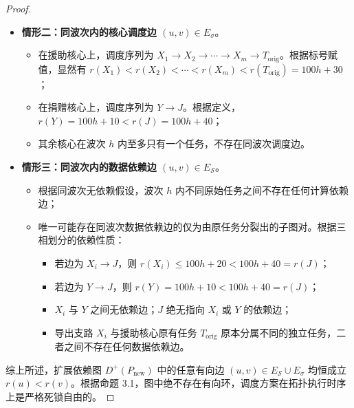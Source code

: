 \documentclass[anonymous,withtoc]{gmcm2026}
\providecommand{\tightlist}{\setlength{\itemsep}{0pt}\setlength{\parskip}{0pt}}
\begin{document}
\begin{proof}
\begin{itemize}
  \begin{itemize}
  \tightlist
  \item
    对于数据依赖边 \((u, v) \in E_{\mathcal{S}}\)：若 \(u\) 与 \(v\) 属于不同波次，由于 Task 拓扑高度的定义，所有外部前驱的高度严格小于后继任务的高度，故必有 \(h(u) \le h(v) - 1\)。因此 \(r(u) \le 100h(u) + 50 \le 100(h(v) - 1) + 50 = 100h(v) - 50 < 100h(v) + 10 \le r(v)\)，整数标号严格递增；
  \item
    对于同一核心上的调度次序边 \((u, v) \in E_\sigma\)：由于新方案严格保持波次单调推进，不同波次间的调度边同样满足 \(h(u) < h(v)\)，故必然有 \(r(u) < r(v)\)。
  \end{itemize}
\item
  \textbf{情形二：同波次内的核心调度边 \((u, v) \in E_\sigma\)}。

  \begin{itemize}
  \tightlist
  \item
    在援助核心上，调度序列为 \(X_1 \to X_2 \to \cdots \to X_m \to T_{\mathrm{orig}}\)。根据标号赋值，显然有 \(r(X_1) < r(X_2) < \cdots < r(X_m) < r(T_{\mathrm{orig}}) = 100h + 30\)；
  \item
    在捐赠核心上，调度序列为 \(Y \to J\)。根据定义，\(r(Y) = 100h + 10 < r(J) = 100h + 40\)；
  \item
    其余核心在波次 \(h\) 内至多只有一个任务，不存在同波次调度边。
  \end{itemize}
\item
  \textbf{情形三：同波次内的数据依赖边 \((u, v) \in E_{\mathcal{S}}\)}。

  \begin{itemize}
  \tightlist
  \item
    根据同波次无依赖假设，波次 \(h\) 内不同原始任务之间不存在任何计算依赖边；
  \item
    唯一可能存在同波次数据依赖边的仅为由原任务分裂出的子图对。根据三相划分的依赖性质：

    \begin{itemize}
    \tightlist
    \item
      若边为 \(X_i \to J\)，则 \(r(X_i) \le 100h + 20 < 100h + 40 = r(J)\)；
    \item
      若边为 \(Y \to J\)，则 \(r(Y) = 100h + 10 < 100h + 40 = r(J)\)；
    \item
      \(X_i\) 与 \(Y\) 之间无依赖边；\(J\) 绝无指向 \(X_i\) 或 \(Y\) 的依赖边；
    \item
      导出支路 \(X_i\) 与援助核心原有任务 \(T_{\mathrm{orig}}\) 原本分属不同的独立任务，二者之间不存在任何数据依赖边。
    \end{itemize}
  \end{itemize}
\end{itemize}

综上所述，扩展依赖图 \(D^+(P_{\mathrm{new}})\) 中的任意有向边 \((u, v) \in E_{\mathcal{S}} \cup E_\sigma\) 均恒成立 \(r(u) < r(v)\)。根据命题 3.1，图中绝不存在有向环，调度方案在拓扑执行时序上是严格死锁自由的。 \end{proof}
\end{document}
